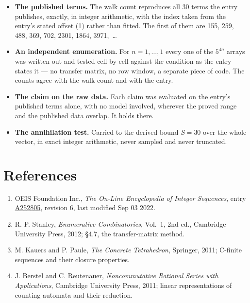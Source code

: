 \documentclass[11pt]{article}
\theoremstyle{definition}
\begin{document}
\begin{itemize}

\item {\bfseries The published terms.} The walk count reproduces all 30 terms the entry publishes, exactly, in integer arithmetic, with the index taken from the entry's stated offset (1) rather than fitted. The first of them are 155, 259, 488, 369, 702, 2301, 1864, 3971,~\dots

\item {\bfseries An independent enumeration.} For $n = 1,\dots,1$ every one of the $5^{4n}$ arrays was written out and tested cell by cell against the condition as the entry states it --- no transfer matrix, no row window, a separate piece of code. The counts agree with the walk count and with the entry.

\item {\bfseries The claim on the raw data.} Each claim was evaluated on the entry's published terms alone, with no model involved, wherever the proved range and the published data overlap. It holds there.

\item {\bfseries The annihilation test.} Carried to the derived bound $S = 30$ over the whole vector, in exact integer arithmetic, never sampled and never truncated.

\end{itemize}

\section{References}

\begin{enumerate}

\item OEIS Foundation Inc., \emph{The On-Line Encyclopedia of Integer Sequences}, entry \href{https://oeis.org/A252805}{A252805}, revision 6, last modified Sep 03 2022.

\item R. P. Stanley, \emph{Enumerative Combinatorics}, Vol.~1, 2nd ed., Cambridge University Press, 2012; \S4.7, the transfer-matrix method.

\item M. Kauers and P. Paule, \emph{The Concrete Tetrahedron}, Springer, 2011; C-finite sequences and their closure properties.

\item J. Berstel and C. Reutenauer, \emph{Noncommutative Rational Series with Applications}, Cambridge University Press, 2011; linear representations of counting automata and their reduction.

\end{enumerate}
\end{document}
